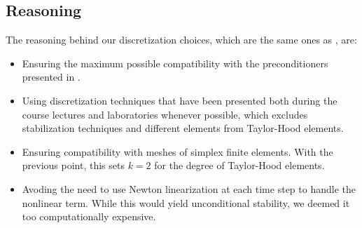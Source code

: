 \subsection{Reasoning}
The reasoning behind our discretization choices, which are the same ones as \cite{Quarteroni}, are:
\begin{itemize}
    \item Ensuring the maximum possible compatibility with the preconditioners presented in \cite{Quarteroni}.
    \item Using discretization techniques that have been presented both during the course lectures and laboratories whenever possible, which excludes stabilization techniques and different elements from Taylor-Hood elements.
    \item Ensuring compatibility with meshes of simplex finite elements. With the previous point, this sets $k = 2$ for the degree of Taylor-Hood elements.
    \item Avoding the need to use Newton linearization at each time step to handle the nonlinear term. While this would yield unconditional stability, we deemed it too computationally expensive.
\end{itemize}